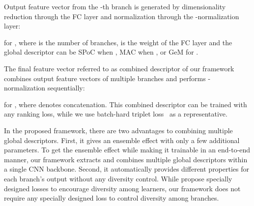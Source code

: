 \documentclass[10pt,twocolumn,letterpaper]{article}
\begin{document}
\begin{CJK}{UTF8}{mj}
Output feature vector  from the -th branch is generated by dimensionality reduction through the FC layer and normalization through the -normalization layer:

for , where  is the number of branches,  is the weight of the FC layer and the global descriptor  can be SPoC when , MAC when , or GeM for .

The final feature vector referred to as combined descriptor  of our framework combines output feature vectors of multiple branches and performs -normalization sequentially:

for , where  denotes concatenation.
This combined descriptor can be trained with any ranking loss, while we use batch-hard triplet loss~\cite{HermansBeyer2017Arxiv} as a representative.

In the proposed framework, there are two advantages to combining multiple global descriptors.
First, it gives an ensemble effect with only a few additional parameters.
To get the ensemble effect while making it trainable in an end-to-end manner, our framework extracts and combines multiple global descriptors within a single CNN backbone.
Second, it automatically provides different properties for each branch's output without any diversity control.
While \cite{Kim_2018_ECCV, opitz2016efficient} propose specially designed losses to encourage diversity among learners, our framework does not require any specially designed loss to control diversity among branches.


\end{CJK}
\end{document}
